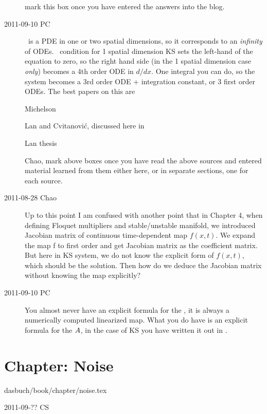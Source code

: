 \begin{description}
 mark this box once you have entered the
answers into the blog.

\item[2011-09-10 PC]
\KSe\ is a PDE in one or two spatial dimensions, so it corresponds to an
\emph{infinity} of ODEs. \Eqv\ condition for 1 spatial dimension KS sets
the left-hand of the equation to zero, so the right hand side (in the 1
spatial dimension case \emph{only}) becomes a 4th order ODE in $d/dx$.
One integral you can do, so the system becomes a 3rd order ODE +
integration constant, or 3 first order ODEs. The best papers on this are

\noindent
[ ] Michelson

\noindent
[ ] Lan and Cvitanovi{\'c}, discussed here in

\noindent
[ ] Lan thesis

\noindent
Chao, mark above boxes once you have read the above sources and entered
material learned from them either here, or in separate sections, one for
each source.

\item[2011-08-28 Chao]
Up to this point I am confused with another point that in Chapter 4, when
defining Floquet multipliers and stable/unstable manifold, we
introduced Jacobian matrix of continuous time-dependent map $f(x,t)$. We
expand the map f to first order and get Jacobian matrix as the
coefficient matrix. But here in KS system, we do not know the explicit
form of $f(x,t)$, which should be the solution. Then how do we deduce the
Jacobian matrix without knowing the map explicitly?

\item[2011-09-10 PC] You almost never have an explicit formula for the
\JacobianM, it is always a numerically computed linearized map. What you
do have is an explicit formula for the {\stabmat} ${A}$, in the case
of KS you have written it out in .

\end{description}

\section{Chapter: Noise}
\label{c-noise}\noindent dasbuch/book/chapter/noise.tex
\begin{description}\item[2011-09-?? CS]

\end{description}

